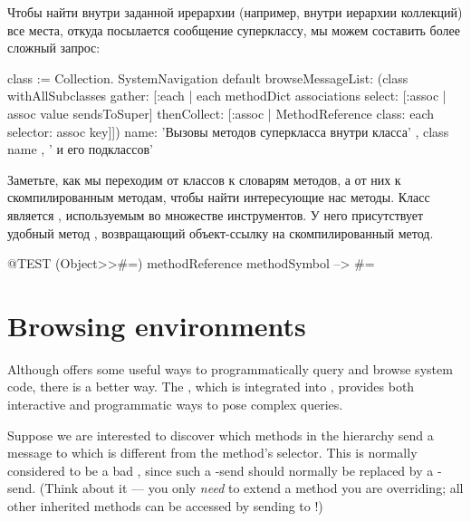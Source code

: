 \documentclass[a4paper,10pt,twoside]{book}
\begin{document}
{%

Чтобы найти внутри заданной ирерархии (например, внутри иерархии коллекций) все места, откуда посылается сообщение суперклассу, мы можем составить более сложный запрос:
\begin{code}{}
class := Collection.
SystemNavigation default
  browseMessageList: (class withAllSubclasses gather: [:each |
    each methodDict associations
      select: [:assoc | assoc value sendsToSuper]
      thenCollect: [:assoc | MethodReference class: each selector: assoc key]])
  name: 'Вызовы методов суперкласса внутри класса' , class name , ' и его подклассов'
\end{code}
Заметьте, как мы переходим от классов к словарям методов, а от них к скомпилированным методам, чтобы найти интересующие нас методы.
Класс  является , используемым во множестве инструментов.
У него присутствует удобный метод , возвращающий объект-ссылку на скомпилированный метод.
\begin{code}{@TEST}
(Object>>#=) methodReference methodSymbol --> #=
\end{code}

\section{Browsing environments}

Although  offers some useful ways to programmatically query and browse system code, there is a better way.  The , which is integrated into \pharo, provides both interactive and programmatic ways to pose complex queries.

Suppose we are interested to discover which methods in the  hierarchy send a message to \super which is different from the method's selector.
This is normally considered to be a bad , since such a \super-send should normally be replaced by a \self-send. (Think about it --- you only \emph{need} \super to extend a method you are overriding; all other inherited methods can be accessed by sending to \self!)

}
\end{document}
